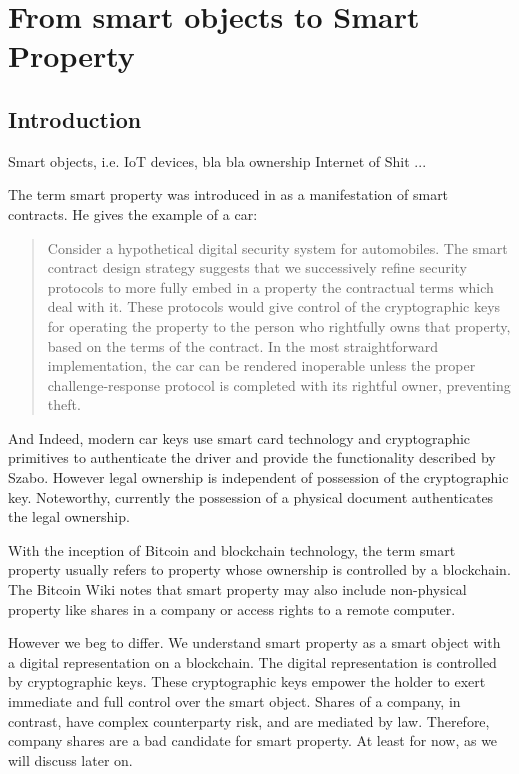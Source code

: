 \chapter{From smart objects to Smart Property}
\label{sec:dao}


\section{Introduction}

Smart objects, i.e. IoT devices, bla bla ownership Internet of Shit ...


The term smart property was introduced in \cite{szabo1997} as a manifestation of smart contracts. He gives the example of a car:
\begin{quote}
Consider a hypothetical digital security system for automobiles. The smart contract design strategy suggests that we successively refine security protocols to more fully embed in a property the contractual terms which deal with it. These protocols would give control of the cryptographic keys for operating the property to the person who rightfully owns that property, based on the terms of the contract. In the most straightforward implementation, the car can be rendered inoperable unless the proper challenge-response protocol is completed with its rightful owner, preventing theft.
\end{quote}

And Indeed, modern car keys use smart card technology and cryptographic primitives to authenticate the driver and provide the functionality described by Szabo. However legal ownership is independent of possession of the cryptographic key. Noteworthy, currently the possession of a physical document authenticates the legal ownership. 

With the inception of Bitcoin and blockchain technology, the term smart property usually refers to property whose ownership is controlled by a blockchain.
The Bitcoin Wiki notes that smart property may also include non-physical property like shares in a company or access rights to a remote computer. 

However we beg to differ. We understand smart property as a smart object with a digital representation on a blockchain. The digital representation is controlled by cryptographic keys. These cryptographic keys empower the holder to exert immediate and full control over the smart object. Shares of a company, in contrast, have complex counterparty risk, and are mediated by law. Therefore, company shares are a bad candidate for smart property. At least for now, as we will discuss later on. 

